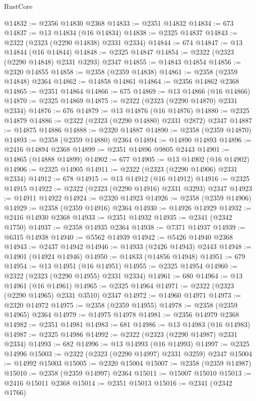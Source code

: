\begin{lexlean}{RustCore}
\begin{coremodule}
@14832 := @2356 @14830 @2368
@14833 := @2351 @14832
@14834 := 673
@14837 := @13 @14834 (@16 @14834)
@14838 := @2325 @14837
@14843 := @2322 (@2323 (@2290 @14838) @2331 @2334)
@14844 := 674
@14847 := @13 @14844 (@16 @14844)
@14848 := @2325 @14847
@14854 := @2322 (@2323 (@2290 @14848) @2331 @3293) @2347
@14855 := @14843 @14854
@14856 := @2320 @14855
@14858 := @2358 (@2359 @14838)
@14861 := @2358 (@2359 @14848) @2364
@14862 := @14858 @14861
@14864 := @2356 @14862 @2368
@14865 := @2351 @14864
@14866 := 675
@14869 := @13 @14866 (@16 @14866)
@14870 := @2325 @14869
@14875 := @2322 (@2323 (@2290 @14870) @2331 @2334)
@14876 := 676
@14879 := @13 @14876 (@16 @14876)
@14880 := @2325 @14879
@14886 := @2322 (@2323 (@2290 @14880) @2331 @2872) @2347
@14887 := @14875 @14886
@14888 := @2320 @14887
@14890 := @2358 (@2359 @14870)
@14893 := @2358 (@2359 @14880) @2364
@14894 := @14890 @14893
@14896 := @2416 @14894 @2368
@14899 := @2351 @14896 @9805 @2443
@14901 := @14865 (@14888 @14899)
@14902 := 677
@14905 := @13 @14902 (@16 @14902)
@14906 := @2325 @14905
@14911 := @2322 (@2323 (@2290 @14906) @2331 @2334)
@14912 := 678
@14915 := @13 @14912 (@16 @14912)
@14916 := @2325 @14915
@14922 := @2322 (@2323 (@2290 @14916) @2331 @3293) @2347
@14923 := @14911 @14922
@14924 := @2320 @14923
@14926 := @2358 (@2359 @14906)
@14929 := @2358 (@2359 @14916) @2364
@14930 := @14926 @14929
@14932 := @2416 @14930 @2368
@14933 := @2351 @14932
@14935 := @2341 (@2342 @1750)
@14937 := @2358 @14935 @2364
@14938 := @7371 @14937
@14939 := @6315 @14938
@14940 := @5562 @14939
@14942 := @5426 @14940 @2368
@14943 := @2437 @14942
@14946 := @14933 (@2426 @14943) @2443
@14948 := @14901 (@14924 @14946)
@14950 := @14833 (@14856 @14948)
@14951 := 679
@14954 := @13 @14951 (@16 @14951)
@14955 := @2325 @14954
@14960 := @2322 (@2323 (@2290 @14955) @2331 @2334)
@14961 := 680
@14964 := @13 @14961 (@16 @14961)
@14965 := @2325 @14964
@14971 := @2322 (@2323 (@2290 @14965) @2331 @3510) @2347
@14972 := @14960 @14971
@14973 := @2320 @14972
@14975 := @2358 (@2359 @14955)
@14978 := @2358 (@2359 @14965) @2364
@14979 := @14975 @14978
@14981 := @2356 @14979 @2368
@14982 := @2351 @14981
@14983 := 681
@14986 := @13 @14983 (@16 @14983)
@14987 := @2325 @14986
@14992 := @2322 (@2323 (@2290 @14987) @2331 @2334)
@14993 := 682
@14996 := @13 @14993 (@16 @14993)
@14997 := @2325 @14996
@15003 := @2322 (@2323 (@2290 @14997) @2331 @3259) @2347
@15004 := @14992 @15003
@15005 := @2320 @15004
@15007 := @2358 (@2359 @14987)
@15010 := @2358 (@2359 @14997) @2364
@15011 := @15007 @15010
@15013 := @2416 @15011 @2368
@15014 := @2351 @15013
@15016 := @2341 (@2342 @1766)

\end{coremodule}
\end{lexlean}
